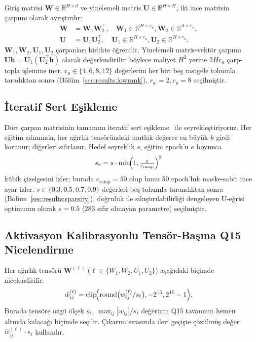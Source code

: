 Giriş matrisi $\mathbf{W} \in \mathbb{R}^{H \times d}$ ve yinelemeli
matris $\mathbf{U} \in \mathbb{R}^{H \times H}$, iki ince matrisin
çarpımı olarak ayrıştırılır:
\begin{align}
\mathbf{W} &= \mathbf{W}_1 \mathbf{W}_2^\top, \quad \mathbf{W}_1 \in \mathbb{R}^{H \times r_w}, \mathbf{W}_2 \in \mathbb{R}^{d \times r_w}, \\
\mathbf{U} &= \mathbf{U}_1 \mathbf{U}_2^\top, \quad \mathbf{U}_1 \in \mathbb{R}^{H \times r_u}, \mathbf{U}_2 \in \mathbb{R}^{H \times r_u}.
\end{align}
$\mathbf{W}_1, \mathbf{W}_2, \mathbf{U}_1, \mathbf{U}_2$
çarpanları birlikte öğrenilir. Yinelemeli matris-vektör çarpımı
$\mathbf{U}\mathbf{h} = \mathbf{U}_1(\mathbf{U}_2^\top \mathbf{h})$
olarak değerlendirilir; böylece maliyet $H^2$ yerine $2 H r_u$
çarp-topla işlemine iner. $r_u \in \{4, 6, 8, 12\}$ değerlerini her
biri beş rastgele tohumla taradıktan sonra
(Bölüm~\ref{sec:results:lowrank}), $r_w = 2, r_u = 8$ seçilmiştir.

\subsection{İteratif Sert Eşikleme}
\label{sec:method:iht}

Dört çarpan matrisinin tamamını iteratif sert
eşikleme~\cite{blumensath2009iht} ile seyrekleştiriyoruz. Her eğitim
adımında, her ağırlık tensöründeki mutlak değerce en büyük $k$ girdi
korunur; diğerleri sıfırlanır. Hedef seyreklik
$s$, eğitim epoch'u $e$ boyunca
\begin{equation}
s_e = s \cdot \min\!\Bigl(1, \tfrac{e}{e_{\text{ramp}}}\Bigr)^{3}
\end{equation}
kübik çizelgesini izler; burada $e_{\text{ramp}} = 50$ olup bunu
50 epoch'luk maske-sabit ince ayar izler.
$s \in \{0.3, 0.5, 0.7, 0.9\}$ değerleri beş tohumla tarandıktan
sonra (Bölüm~\ref{sec:results:sparsity}), doğruluk ile
sıkıştırılabilirliği dengeleyen U-eğrisi optimumu olarak $s = 0.5$
(283 sıfır olmayan parametre) seçilmiştir.

\subsection{Aktivasyon Kalibrasyonlu Tensör-Başına Q15 Nicelendirme}
\label{sec:method:q15}

Her ağırlık tensörü $\mathbf{W}^{(\ell)}$
($\ell \in \{W_1, W_2, U_1, U_2\}$) aşağıdaki biçimde nicelendirilir:
\begin{equation}
\hat{w}^{(\ell)}_{ij}
  = \mathrm{clip}\!\Bigl(
        \mathrm{round}\bigl(w^{(\ell)}_{ij} / s_\ell\bigr),
        -2^{15}, 2^{15}-1
    \Bigr),
\end{equation}
Burada tensöre özgü ölçek $s_\ell$, $\max_{ij}|w_{ij}| / s_\ell$
değerinin Q15 tavanının hemen altında kalacağı biçimde seçilir.
Çıkarım sırasında ileri geçişte çözülmüş değer
$\hat{w}^{(\ell)}_{ij} \cdot s_\ell$ kullanılır.

